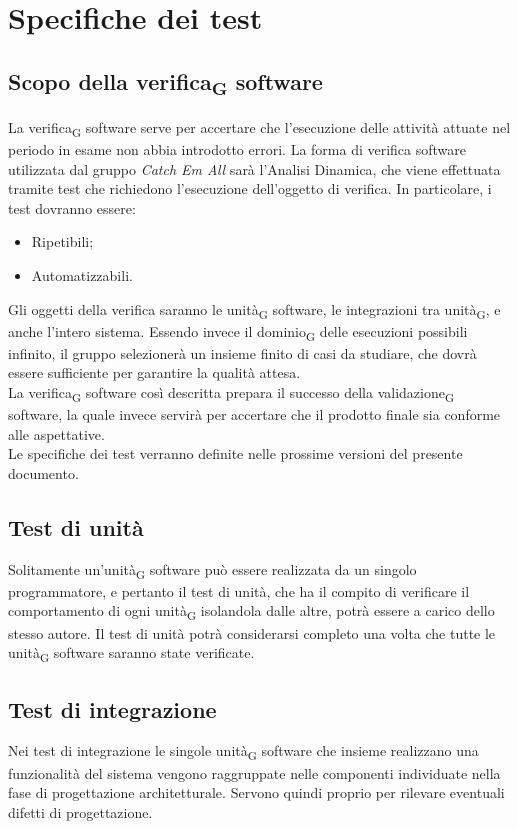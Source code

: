 \section{Specifiche dei test}

\subsection{Scopo della verifica\textsubscript{G} software}
La verifica\textsubscript{G} software serve per accertare che l'esecuzione delle attività attuate nel periodo in esame non abbia introdotto errori. La forma di verifica software utilizzata dal gruppo \textit{Catch Em All} sarà l'Analisi Dinamica, che viene effettuata tramite test che richiedono l'esecuzione dell'oggetto di verifica. In particolare, i test dovranno essere:
\begin{itemize}
	\item Ripetibili;
	\item Automatizzabili.
\end{itemize}
Gli oggetti della verifica saranno le unità\textsubscript{G} software, le integrazioni tra unità\textsubscript{G}, e anche l'intero sistema. Essendo invece il dominio\textsubscript{G} delle esecuzioni possibili infinito, il gruppo selezionerà un insieme finito di casi da studiare, che dovrà essere sufficiente per garantire la qualità attesa.\\
La verifica\textsubscript{G} software così descritta prepara il successo della validazione\textsubscript{G} software, la quale invece servirà per accertare che il prodotto finale sia conforme alle aspettative.\\
Le specifiche dei test verranno definite nelle prossime versioni del presente documento.
\subsection{Test di unità}
Solitamente un'unità\textsubscript{G} software può essere realizzata da un singolo programmatore, e pertanto il test di unità, che ha il compito di verificare il comportamento di ogni unità\textsubscript{G} isolandola dalle altre, potrà essere a carico dello stesso autore. Il test di unità potrà considerarsi completo una volta che tutte le unità\textsubscript{G} software saranno state verificate.

\subsection{Test di integrazione}
Nei test di integrazione le singole unità\textsubscript{G} software che insieme realizzano una funzionalità del sistema vengono raggruppate nelle componenti individuate nella fase di progettazione architetturale. Servono quindi proprio per rilevare eventuali difetti di progettazione.

